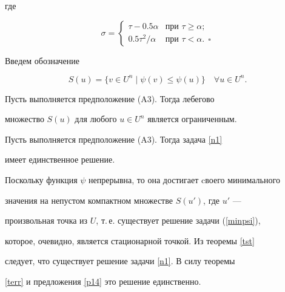 где


$$


\sigma  =


\begin{cases}


\tau-0.5\alpha & \text{при } \tau \ge \alpha;\\


0.5\tau^2/\alpha & \text{при } \tau < \alpha.\ \ \square


\end{cases}


$$





Введем обозначение


$$


S(u)=\{ v \in U^n \mid \psi(v) \le \psi(u)\} \quad \forall u \in U^n.


$$





\begin{cors}\label{cor1}


Пусть выполняется предположение (A3). Тогда лебегово


множество $S(u)$ для любого $u \in U^n $ является ограниченным.


\end{cors}





\begin{cors}\label{cor2}


Пусть выполняется предположение (A3). Тогда задача \ref{n1}


имеет единственное решение.


\end{cors}





\begin{pf}


Поскольку функция $\psi$ непрерывна, то она достигает cвоего минимального 


значения на непустом компактном множестве $S(u')$, где $u'$ --- 


произвольная точка из $U$, т.\,е. существует решение задачи (\ref{minpsi}), 


которое, очевидно, является стационарной точкой. Из теоремы \ref{tst} 


следует, что существует решение задачи \ref{n1}. В силу теоремы 


\ref{terr} и предложения \ref{p14} это решение единственно.


\end{pf}





